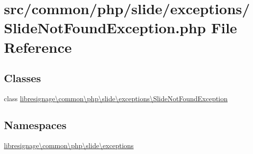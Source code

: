 \hypertarget{SlideNotFoundException_8php}{}\section{src/common/php/slide/exceptions/\+Slide\+Not\+Found\+Exception.php File Reference}
\label{SlideNotFoundException_8php}
\subsection*{Classes}
\begin{DoxyCompactItemize}
\item 
class \hyperlink{classlibresignage_1_1common_1_1php_1_1slide_1_1exceptions_1_1SlideNotFoundException}{libresignage\textbackslash{}common\textbackslash{}php\textbackslash{}slide\textbackslash{}exceptions\textbackslash{}\+Slide\+Not\+Found\+Exception}
\end{DoxyCompactItemize}
\subsection*{Namespaces}
\begin{DoxyCompactItemize}
\item 
 \hyperlink{namespacelibresignage_1_1common_1_1php_1_1slide_1_1exceptions}{libresignage\textbackslash{}common\textbackslash{}php\textbackslash{}slide\textbackslash{}exceptions}
\end{DoxyCompactItemize}
